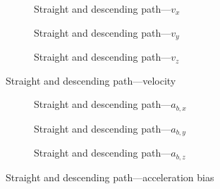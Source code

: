 \begin{figure}[H]
    \centering
    \begin{subfigure}{0.3\textwidth}
        
        \caption{Straight and descending path---$v_x$}
    \end{subfigure}
    \hfill
    \begin{subfigure}{0.3\textwidth}
        
        \caption{Straight and descending path---$v_y$}
    \end{subfigure}
    \hfill
    \begin{subfigure}{0.3\textwidth}
        
        \caption{Straight and descending path---$v_z$}
    \end{subfigure}
    \caption{Straight and descending path---velocity}\label{fig:straight-descending-vel}
\end{figure}

\begin{figure}[H]
    \centering
    \begin{subfigure}{0.3\textwidth}
        
        \caption{Straight and descending path---$a_{b,x}$}
    \end{subfigure}
    \hfill
    \begin{subfigure}{0.3\textwidth}
        
        \caption{Straight and descending path---$a_{b,y}$}
    \end{subfigure}
    \hfill
    \begin{subfigure}{0.3\textwidth}
        
        \caption{Straight and descending path---$a_{b,z}$}
    \end{subfigure}
    \caption{Straight and descending path---acceleration bias}\label{fig:straight-descending-abias}
\end{figure}

